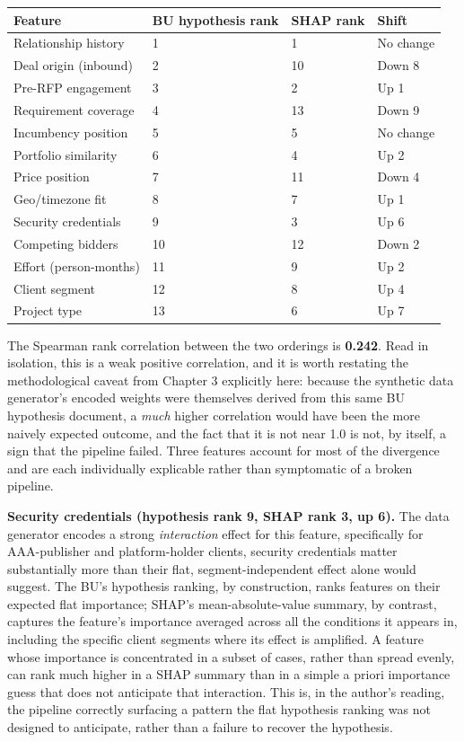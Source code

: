 \documentclass[12pt,oneside]{report}
\begin{document}
\begin{longtable}[]{@{}llll@{}}
\toprule\noalign{}
Feature & BU hypothesis rank & SHAP rank & Shift \\
\midrule\noalign{}
\endhead
\bottomrule\noalign{}
\endlastfoot
Relationship history & 1 & 1 & No change \\
Deal origin (inbound) & 2 & 10 & Down 8 \\
Pre-RFP engagement & 3 & 2 & Up 1 \\
Requirement coverage & 4 & 13 & Down 9 \\
Incumbency position & 5 & 5 & No change \\
Portfolio similarity & 6 & 4 & Up 2 \\
Price position & 7 & 11 & Down 4 \\
Geo/timezone fit & 8 & 7 & Up 1 \\
Security credentials & 9 & 3 & Up 6 \\
Competing bidders & 10 & 12 & Down 2 \\
Effort (person-months) & 11 & 9 & Up 2 \\
Client segment & 12 & 8 & Up 4 \\
Project type & 13 & 6 & Up 7 \\
\end{longtable}

The Spearman rank correlation between the two orderings is
\textbf{0.242}. Read in isolation, this is a weak positive correlation,
and it is worth restating the methodological caveat from Chapter 3
explicitly here: because the synthetic data generator's encoded weights
were themselves derived from this same BU hypothesis document, a
\emph{much} higher correlation would have been the more naively expected
outcome, and the fact that it is not near 1.0 is not, by itself, a sign
that the pipeline failed. Three features account for most of the
divergence and are each individually explicable rather than symptomatic
of a broken pipeline.

\textbf{Security credentials (hypothesis rank 9, SHAP rank 3, up 6).}
The data generator encodes a strong \emph{interaction} effect for this
feature, specifically for AAA-publisher and platform-holder clients,
security credentials matter substantially more than their flat,
segment-independent effect alone would suggest. The BU's hypothesis
ranking, by construction, ranks features on their expected flat
importance; SHAP's mean-absolute-value summary, by contrast, captures
the feature's importance averaged across all the conditions it appears
in, including the specific client segments where its effect is
amplified. A feature whose importance is concentrated in a subset of
cases, rather than spread evenly, can rank much higher in a SHAP summary
than in a simple a priori importance guess that does not anticipate that
interaction. This is, in the author's reading, the pipeline correctly
surfacing a pattern the flat hypothesis ranking was not designed to
anticipate, rather than a failure to recover the hypothesis.
\end{document}
